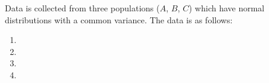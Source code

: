 Data is collected from three populations ($A$, $B$, $C$) which have normal distributions with a common variance. The data is as follows:
\begin{enumerate}[label={(\alph*)}]
    \item 
    \item \newpage
    \item \vspace{0.3in}
    \item 
\end{enumerate}